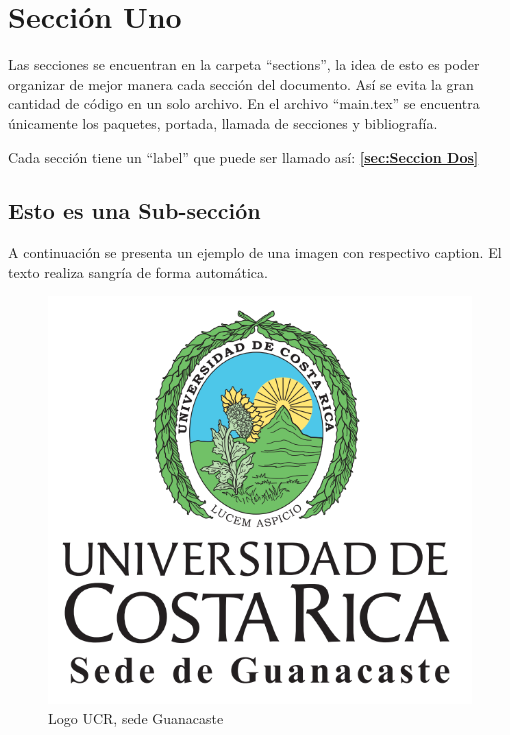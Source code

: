 \section{Sección Uno}
\label{sec:Seccion Uno}

Las secciones se encuentran en la carpeta “sections”, la idea de esto es poder organizar de mejor manera cada sección del documento. Así se evita la gran cantidad de código en un solo archivo. En el archivo “main.tex” se encuentra únicamente los paquetes, portada, llamada de secciones y bibliografía.

Cada sección tiene un “label” que puede ser llamado así: \textbf{\ref{sec:Seccion Dos}}

\subsection{Esto es una Sub-sección}

A continuación se presenta un ejemplo de una imagen con respectivo caption. El texto realiza sangría de forma automática. 

\vspace{1cm}

\begin{figure}[h!]
\centering
\includegraphics[scale = 0.2]{images/thumbnail_logo1.png}
\caption{Logo UCR, sede Guanacaste}
\end{figure}

